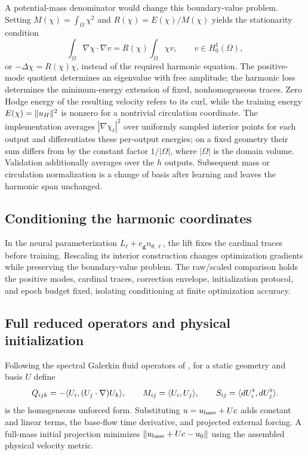 A potential-mass denominator would change this boundary-value problem. Setting $M(\chi)=\int_\Omega\chi^2$ and $R(\chi)=E(\chi)/M(\chi)$ yields the stationarity condition
\begin{equation}
\int_\Omega\nabla\chi\cdot\nabla v
=R(\chi)\int_\Omega\chi v,\qquad v\in H_0^1(\Omega),
\end{equation}
or $-\Delta\chi=R(\chi)\chi$, instead of the required harmonic equation. The positive-mode quotient determines an eigenvalue with free amplitude; the harmonic loss determines the minimum-energy extension of fixed, nonhomogeneous traces. Zero Hodge energy of the resulting velocity refers to its curl, while the training energy $E(\chi)=\lVert u_H\rVert^2$ is nonzero for a nontrivial circulation coordinate. The implementation averages $|\nabla\chi_\ell|^2$ over uniformly sampled interior points for each output and differentiates these per-output energies; on a fixed geometry their sum differs from  by the constant factor $1/|\Omega|$, where $|\Omega|$ is the domain volume. Validation additionally averages over the $h$ outputs. Subsequent mass or circulation normalization is a change of basis after learning and leaves the harmonic span unchanged.

\subsection{Conditioning the harmonic coordinates}
In the neural parameterization $L_\ell+e_{\mathbf g}n_{\theta,\ell}$, the lift fixes the cardinal traces before training. Rescaling its interior construction changes optimization gradients while preserving the boundary-value problem. The raw/scaled comparison holds the positive modes, cardinal traces, correction envelope, initialization protocol, and epoch budget fixed, isolating conditioning at finite optimization accuracy.

\subsection{Full reduced operators and physical initialization}
{Following the spectral Galerkin fluid operators of \citet{dewitt2012fluid,liu2015model}, for a static geometry and basis $U$ define}
\begin{equation}
Q_{ijk}=-\langle U_i,(U_j\cdot\nabla)U_k\rangle,\qquad
M_{ij}=\langle U_i,U_j\rangle,\qquad S_{ij}=\langle dU_i^\flat,dU_j^\flat\rangle.
\end{equation}
 is the homogeneous unforced form. Substituting $u=u_{\rm base}+Uc$ adds constant and linear terms, the base-flow time derivative, and projected external forcing. A full-mass initial projection minimizes $\lVert u_{\rm base}+Uc-u_0\rVert$ using the assembled physical velocity metric.

